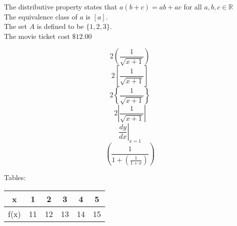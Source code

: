 \documentclass[18px]{article}
\begin{document}
The distributive property states that $a(b+c)=ab+ac$ for all $a,b,c \in \mathbb{R}$\\[6pt]
The equivalence class of $a$ is $[a]$.\\[6pt]
The set $A$ is defined to be $\{1,2,3\}$.\\[6pt]
The movie ticket cost $\$12.00$

$$2\left(\frac{1}{\sqrt{x + 1}}\right)$$
$$2\left[\frac{1}{\sqrt{x + 1}}\right]$$
$$2\left\{\frac{1}{\sqrt{x + 1}}\right\}$$
$$2\left|\frac{1}{\sqrt{x + 1}}\right|$$
$$\left.\frac{dy}{dx}\right|_{x=1}$$
$$\left(\frac{1}{1 + \left(\frac{1}{1+x}\right)} \right)$$

Tables:\\

\begin{tabular}{|c||c|c|c|c|c|}
\hline
x & 1 & 2 & 3 & 4 & 5 \\ \hline
f(x) & 11 & 12 & 13 & 14 & 15 \\ \hline 

\end{tabular}
\end{document}
